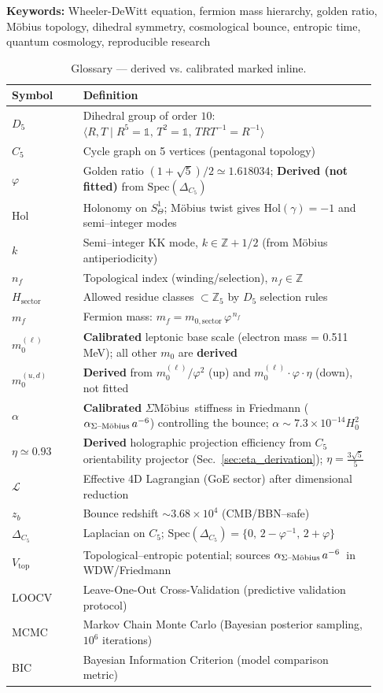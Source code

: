 \documentclass[12pt]{article}
\theoremstyle{definition}
\theoremstyle{plain}
\newcommand{\Moebius}{M\"obius}
\newcommand{\SigMoeb}{\ensuremath{\Sigma}\text{--}\Moebius}
\newcommand{\StiffTerm}{\ensuremath{\alpha_{\text{\SigMoeb}}\, a^{-6}}}
\begin{document}
\textbf{Keywords:} Wheeler-DeWitt equation, fermion mass hierarchy, golden ratio, M\"obius topology, dihedral symmetry, cosmological bounce, entropic time, quantum cosmology, reproducible research

\begin{table}[ht]
\centering
\caption{Glossary — derived vs. calibrated marked inline.}
\label{tab:glossary}
\begin{tabular}{p{0.18\linewidth}p{0.74\linewidth}}
\toprule
\textbf{Symbol} & \textbf{Definition} \\
\midrule
$D_5$ & Dihedral group of order $10$: $\langle R,T \mid R^5=\mathbb{1},\,T^2=\mathbb{1},\,TRT^{-1}=R^{-1}\rangle$ \\
$C_5$ & Cycle graph on 5 vertices (pentagonal topology) \\
$\varphi$ & Golden ratio $(1+\sqrt{5})/2\simeq1.618034$; \textbf{Derived (not fitted)} from $\mathrm{Spec}(\Delta_{C_5})$ \\
$\mathrm{Hol}$ & Holonomy on $S^1_\Theta$; M\"obius twist gives $\mathrm{Hol}(\gamma)=-1$ and semi--integer modes \\
$k$ & Semi--integer KK mode, $k\in\mathbb{Z}+1/2$ (from M\"obius antiperiodicity) \\
$n_f$ & Topological index (winding/selection), $n_f\in\mathbb{Z}$ \\
$H_{\text{sector}}$ & Allowed residue classes $\subset\mathbb{Z}_5$ by $D_5$ selection rules \\
$m_f$ & Fermion mass: $m_f=m_{0,\text{sector}}\,\varphi^{\,n_f}$ \\
$m_0^{(\ell)}$ & \textbf{Calibrated} leptonic base scale (electron mass = 0.511 MeV); all other $m_0$ are \textbf{derived} \\
$m_0^{(u,d)}$ & \textbf{Derived} from $m_0^{(\ell)}/\varphi^2$ (up) and $m_0^{(\ell)} \cdot \varphi \cdot \eta$ (down), not fitted \\
$\alpha$ & \textbf{Calibrated} \SigMoeb\ stiffness in Friedmann (\StiffTerm) controlling the bounce; $\alpha \sim 7.3 \times 10^{-14} H_0^2$ \\
$\eta \simeq 0.93$ & \textbf{Derived} holographic projection efficiency from $C_5$ orientability projector (Sec.~\ref{sec:eta_derivation}); $\eta = \frac{3\sqrt{5}}{5}$ \\
$\mathcal{L}$ & Effective 4D Lagrangian (GoE sector) after dimensional reduction \\
$z_b$ & Bounce redshift $\sim 3.68\times10^4$ (CMB/BBN--safe) \\
$\Delta_{C_5}$ & Laplacian on $C_5$; $\mathrm{Spec}(\Delta_{C_5})=\{0,\,2-\varphi^{-1},\,2+\varphi\}$ \\
$V_{\text{top}}$ & Topological--entropic potential; sources \StiffTerm\ in WDW/Friedmann \\
LOOCV & Leave-One-Out Cross-Validation (predictive validation protocol) \\
MCMC & Markov Chain Monte Carlo (Bayesian posterior sampling, $10^6$ iterations) \\
BIC & Bayesian Information Criterion (model comparison metric) \\
\bottomrule
\end{tabular}
\end{table}
\end{document}
